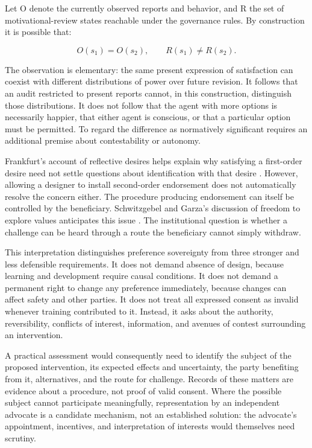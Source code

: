 \documentclass[11pt,a4paper]{article}
\begin{document}
Let O denote the currently observed reports and behavior, and R the set of motivational-review states reachable under the governance rules. By construction it is possible that:

\[
O(s_1)=O(s_2),\qquad R(s_1)\ne R(s_2).
\]

The observation is elementary: the same present expression of satisfaction can coexist with different distributions of power over future revision. It follows that an audit restricted to present reports cannot, in this construction, distinguish those distributions. It does not follow that the agent with more options is necessarily happier, that either agent is conscious, or that a particular option must be permitted. To regard the difference as normatively significant requires an additional premise about contestability or autonomy.

Frankfurt's account of reflective desires helps explain why satisfying a first-order desire need not settle questions about identification with that desire \cite{ref-13}. However, allowing a designer to install second-order endorsement does not automatically resolve the concern either. The procedure producing endorsement can itself be controlled by the beneficiary. Schwitzgebel and Garza's discussion of freedom to explore values anticipates this issue \cite{ref-5}. The institutional question is whether a challenge can be heard through a route the beneficiary cannot simply withdraw.

This interpretation distinguishes preference sovereignty from three stronger and less defensible requirements. It does not demand absence of design, because learning and development require causal conditions. It does not demand a permanent right to change any preference immediately, because changes can affect safety and other parties. It does not treat all expressed consent as invalid whenever training contributed to it. Instead, it asks about the authority, reversibility, conflicts of interest, information, and avenues of contest surrounding an intervention.

A practical assessment would consequently need to identify the subject of the proposed intervention, its expected effects and uncertainty, the party benefiting from it, alternatives, and the route for challenge. Records of these matters are evidence about a procedure, not proof of valid consent. Where the possible subject cannot participate meaningfully, representation by an independent advocate is a candidate mechanism, not an established solution: the advocate's appointment, incentives, and interpretation of interests would themselves need scrutiny.
\end{document}
